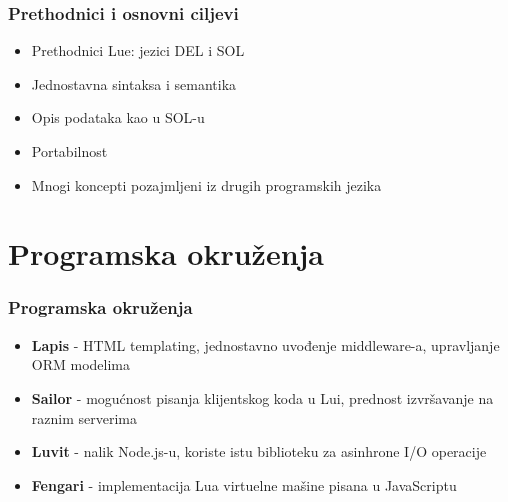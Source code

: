 \documentclass{beamer}
\begin{document}
\begin{frame}
\frametitle{Prethodnici i osnovni ciljevi}

\begin{itemize}
\item Prethodnici Lue: jezici DEL i SOL

\item Jednostavna sintaksa i semantika

\item Opis podataka  kao  u  SOL-u   

\item Portabilnost  

\item  Mnogi koncepti pozajmljeni iz drugih programskih jezika

\end{itemize}
\end{frame}



\section{Programska okruženja}
\begin{frame} 
\frametitle{Programska okruženja}

\begin{itemize}
\item \textbf{Lapis} - HTML templating, jednostavno uvođenje middleware-a, upravljanje ORM modelima 

\item \textbf{Sailor} - mogućnost pisanja klijentskog koda u Lui, prednost izvršavanje na raznim serverima

\item \textbf{Luvit} - nalik Node.js-u, koriste istu biblioteku za asinhrone I/O operacije

\item \textbf{Fengari} - implementacija Lua virtuelne mašine pisana u JavaScriptu

\end{itemize}

\end{frame}
\end{document}
